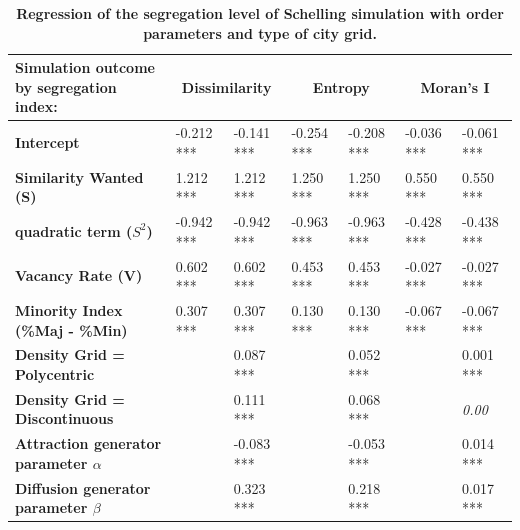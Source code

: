\documentclass{JASSS}
\begin{document}
\begin{table}[]
\centering
\begin{threeparttable}
\caption{\textbf{Regression of the segregation level of Schelling simulation with order parameters and type of city grid.}}
\label{tab:regressionSchelling}
\begin{tabular}{|p{2.5cm}|ll|ll|ll|}
\hline
Simulation outcome by segregation index:    & \multicolumn{2}{c|}{\textbf{Dissimilarity}}   & \multicolumn{2}{c|}{\textbf{Entropy}} & \multicolumn{2}{c|}{\textbf{Moran's I}} \\ \hline
\textbf{Intercept}                          & -0.212 *** & -0.141 ***                       & -0.254 ***        & -0.208 ***        & -0.036 ***           & -0.061 ***               \\ \hline
\textbf{Similarity Wanted (S)}              & 1.212 ***  & 1.212 ***                        & 1.250 ***         & 1.250 ***         & 0.550 ***            & 0.550 ***                \\ 
\textbf{quadratic term ($S^2$)}               & -0.942 *** & -0.942 ***                       & -0.963 ***        & -0.963 ***        & -0.428 ***           & -0.438 ***               \\ 
\textbf{Vacancy Rate (V)}                   & 0.602 ***  & 0.602 ***                        & 0.453 ***         & 0.453 ***         & -0.027 ***           & -0.027 ***               \\ 
\textbf{Minority Index (\%Maj - \%Min)}     & 0.307 ***  & 0.307 ***                        & 0.130 ***         & 0.130 ***         & -0.067 ***           & -0.067 ***               \\ \hline
\textbf{Density Grid = Polycentric}         &            & 0.087 ***                        &                   & 0.052 ***         &                      & 0.001 ***                \\ 
\textbf{Density Grid = Discontinuous}       &            & 0.111 ***                        &                   & 0.068 ***         &                      & \textit{0.00}              \\
\textbf{Attraction generator parameter $\alpha$} &            & -0.083 ***                       &                   & -0.053 ***        &                      & 0.014 ***                \\ 
\textbf{Diffusion generator parameter $\beta$}   &            & 0.323 ***                        &                   & 0.218 ***         &                      & 0.017 ***           \\ \hline

\end{tabular}
\end{threeparttable}
\end{table}
\end{document}
